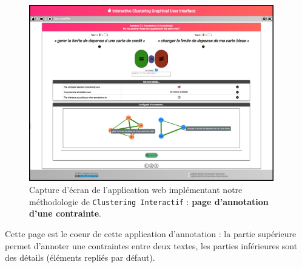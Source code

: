 		\begin{figure}[H]
			\centering
			\includegraphics[width=0.95\textwidth]{figures/interactive-clustering-application-annotation-0full}
			\caption{
				Capture d'écran de l'application web implémentant notre méthodologie de \texttt{Clustering Interactif} : \textbf{page d'annotation d'une contrainte}.
			}
			\label{figure:C-WEB-APPLICATION-ANNOTATION}
		\end{figure}
		
		Cette page est le coeur de cette application d'annotation : la partie supérieure permet d'annoter une contraintes entre deux textes, les parties inférieures sont des détails (éléments repliés par défaut).
		
